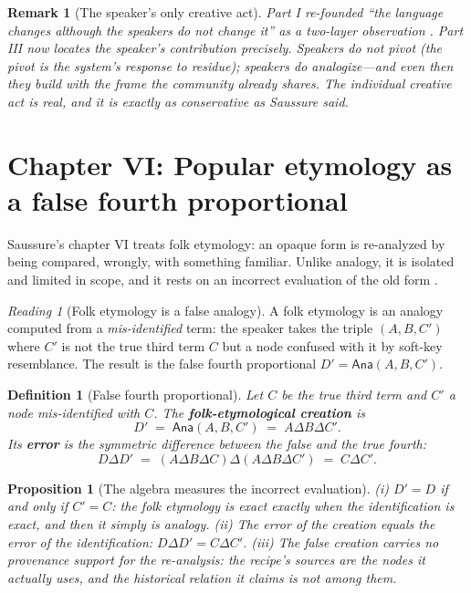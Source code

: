 \documentclass[11pt,a4paper]{article}
\newtheorem{definition}[principle]{Definition}
\newtheorem{proposition}[principle]{Proposition}
\newtheorem{remark}[principle]{Remark}
\theoremstyle{remark}
\newtheorem{reading}[principle]{Reading}
\newcommand{\xor}{\ensuremath{\Delta}}                   %
\newcommand{\Ana}{\ensuremath{\mathsf{Ana}}}             %
\begin{document}
\begin{remark}[The speaker's only creative act]
Part I re-founded ``the language changes although the speakers do not change
it'' as a two-layer observation \cite{part1}. Part III now locates the
speaker's contribution precisely. Speakers do not pivot (the pivot is the
system's response to residue); speakers \emph{do} analogize---and even then
they build with the frame the community already shares. The individual
creative act is real, and it is exactly as conservative as Saussure said.
\end{remark}

\section{Chapter VI: Popular etymology as a false fourth proportional}
\label{sec:ch6}

Saussure's chapter VI treats folk etymology: an opaque form is re-analyzed by
being compared, wrongly, with something familiar. Unlike analogy, it is
isolated and limited in scope, and it rests on an incorrect evaluation of the
old form \cite[Part III, ch.~VI]{harris1983}.

\begin{reading}[Folk etymology is a false analogy]
\label{read:folk}
A folk etymology is an analogy computed from a \emph{mis-identified} term:
the speaker takes the triple $(A,B,C')$ where $C'$ is not the true third term
$C$ but a node confused with it by soft-key resemblance. The result is the
false fourth proportional $D' = \Ana(A,B,C')$.
\end{reading}

\begin{definition}[False fourth proportional]
\label{def:folk}
Let $C$ be the true third term and $C'$ a node mis-identified with $C$. The
\textbf{folk-etymological creation} is
\[
  D' \;=\; \Ana(A,B,C') \;=\; A \xor B \xor C' .
\]
Its \textbf{error} is the symmetric difference between the false and the true
fourth:
\[
  D \xor D' \;=\; (A \xor B \xor C) \xor (A \xor B \xor C')
  \;=\; C \xor C'.
\]
\end{definition}

\begin{proposition}[The algebra measures the incorrect evaluation]
\label{prop:folk}
(i) $D' = D$ if and only if $C' = C$: the folk etymology is exact exactly
when the identification is exact, and then it simply is analogy.
(ii) The error of the creation equals the error of the identification:
$D \xor D' = C \xor C'$. (iii) The false creation carries no provenance
support for the re-analysis: the recipe's sources are the nodes it actually
uses, and the historical relation it claims is not among them.
\end{proposition}
\end{document}
